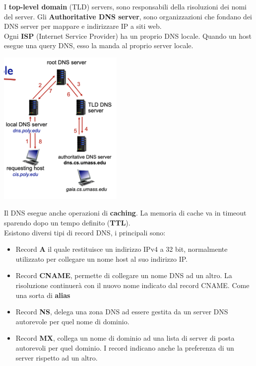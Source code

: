 \documentclass{article}
\begin{document}
I \textbf{top-level domain} (TLD) servers, sono responsabili della risoluzioni dei nomi del server.
Gli \textbf{Authoritative DNS server}, sono organizzazioni che fondano dei DNS server per mappare e indirizzare IP a siti web.\\
Ogni \textbf{ISP} (Internet Service Provider) ha un proprio DNS locale. Quando un host esegue una query DNS, esso la manda al proprio server locale.
\begin{center}
  \includegraphics[width=6cm]{img/dnsResolution.png}
\end{center}
Il DNS esegue anche operazioni di \textbf{caching}. La memoria di cache va in timeout sparendo dopo un tempo definito (\textbf{TTL}).\\
Esistono diversi tipi di record DNS, i principali sono:
\begin{itemize}
  \item Record \textbf{A} il quale restituisce un indirizzo IPv4 a 32 bit, normalmente utilizzato per collegare un nome host al suo indirizzo IP.
  \item Record \textbf{CNAME}, permette di collegare un nome DNS ad un altro. La risoluzione continuerà con il nuovo nome indicato dal record CNAME. Come una sorta di \textbf{alias}
  \item Record \textbf{NS}, delega una zona DNS ad essere gestita da un server DNS autorevole per quel nome di dominio.
  \item Record \textbf{MX}, collega un nome di dominio ad una lista di server di posta autorevoli per quel dominio. I record indicano anche la preferenza di un server rispetto ad un altro.
\end{itemize}
\end{document}
